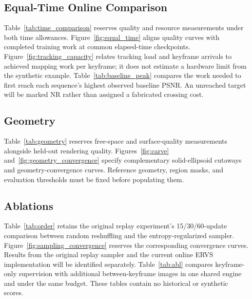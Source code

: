 




\subsection{Equal-Time Online Comparison}
\label{ssec:time_results}

Table~\ref{tab:time_comparison} reserves quality and resource measurements
under both time allowances. Figure~\ref{fig:equal_time} aligns quality curves
with completed training work at common elapsed-time checkpoints.
Figure~\ref{fig:tracking_capacity} relates tracking load and keyframe arrivals
to achieved mapping work per keyframe; it does not estimate a hardware limit
from the synthetic example.
Table~\ref{tab:baseline_peak} compares the work needed to first reach each
sequence's highest observed baseline PSNR. An unreached target will be marked
NR rather than assigned a fabricated crossing cost.






\subsection{Geometry}
\label{ssec:geometry_results}

Table~\ref{tab:geometry} reserves free-space and surface-quality measurements
alongside held-out rendering quality.
Figures~\ref{fig:carve} and~\ref{fig:geometry_convergence} specify complementary
solid-ellipsoid cutaways and geometry-convergence curves. Reference geometry,
region masks, and evaluation thresholds must be fixed before populating them.





\subsection{Ablations}
\label{ssec:abl}

Table~\ref{tab:order} retains the original replay experiment's
15/30/60-update comparison between random reshuffling and the entropy-regularized
sampler. Figure~\ref{fig:sampling_convergence} reserves the corresponding
convergence curves. Results from the original replay sampler and the current
online ERVS implementation will be identified separately.
Table~\ref{tab:abl} compares keyframe-only supervision with additional
between-keyframe images in one shared engine and under the same budget.
These tables contain no historical or synthetic scores.




\clearpage
